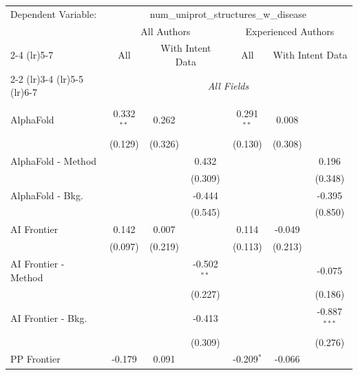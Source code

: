\begingroup
\centering
\begin{tabular}{lcccccc}
   \tabularnewline \midrule \midrule
   Dependent Variable: & \multicolumn{6}{c}{num\_uniprot\_structures\_w\_disease}\\
 & \multicolumn{3}{c}{All Authors} & \multicolumn{3}{c}{Experienced Authors} \\
\cmidrule(lr){2-4} \cmidrule(lr){5-7}
 & \multicolumn{1}{c}{All} & \multicolumn{2}{c}{With Intent Data} & \multicolumn{1}{c}{All} & \multicolumn{2}{c}{With Intent Data} \\
\cmidrule(lr){2-2} \cmidrule(lr){3-4} \cmidrule(lr){5-5} \cmidrule(lr){6-7}
 & \multicolumn{6}{c}{\textit{All Fields}} \\ \\
   AlphaFold            & 0.332$^{**}$  & 0.262   &               & 0.291$^{**}$  & 0.008   &   \\   
                        & (0.129)       & (0.326) &               & (0.130)       & (0.308) &   \\   
   AlphaFold - Method   &               &         & 0.432         &               &         & 0.196\\   
                        &               &         & (0.309)       &               &         & (0.348)\\   
   AlphaFold - Bkg.     &               &         & -0.444        &               &         & -0.395\\   
                        &               &         & (0.545)       &               &         & (0.850)\\   
   AI Frontier          & 0.142         & 0.007   &               & 0.114         & -0.049  &   \\   
                        & (0.097)       & (0.219) &               & (0.113)       & (0.213) &   \\   
   AI Frontier - Method &               &         & -0.502$^{**}$ &               &         & -0.075\\   
                        &               &         & (0.227)       &               &         & (0.186)\\   
   AI Frontier - Bkg.   &               &         & -0.413        &               &         & -0.887$^{***}$\\   
                        &               &         & (0.309)       &               &         & (0.276)\\   
   PP Frontier          & -0.179        & 0.091   &               & -0.209$^{*}$  & -0.066  &   \\   

\end{tabular}
